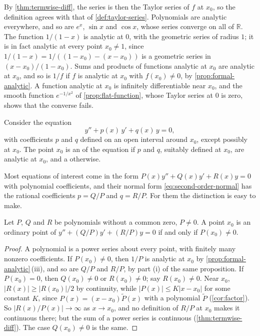 By \cref{thm:termwise-diff}, the series is then the Taylor series of $f$ at $x_0$, so the definition agrees with that of \cref{def:taylor-series}. Polynomials are analytic everywhere, and so are $e^x$, $\sin x$ and $\cos x$, whose series converge on all of $\mathbb R$. The function $1/(1-x)$ is analytic at $0$, with the geometric series of radius $1$; it is in fact analytic at every point $x_0\ne1$, since $1/(1-x)=1/((1-x_0)-(x-x_0))$ is a geometric series in $(x-x_0)/(1-x_0)$. Sums and products of functions analytic at $x_0$ are analytic at $x_0$, and so is $1/f$ if $f$ is analytic at $x_0$ with $f(x_0)\ne0$, by \cref{prop:formal-analytic}. A function analytic at $x_0$ is infinitely differentiable near $x_0$, and the smooth function $e^{-1/x^2}$ of \cref{prop:flat-function}, whose Taylor series at $0$ is zero, shows that the converse fails.

\begin{definition}
\label{def:ordinary-point}
Consider the equation
\begin{equation}
y''+p(x)\,y'+q(x)\,y=0 ,
\label{eq:second-order-normal}
\end{equation}
with coefficients $p$ and $q$ defined on an open interval around $x_0$, except possibly at $x_0$. The point $x_0$ is an  of the equation if $p$ and $q$, suitably defined at $x_0$, are analytic at $x_0$, and a  otherwise.
\end{definition}

Most equations of interest come in the form $P(x)y''+Q(x)y'+R(x)y=0$ with polynomial coefficients, and their normal form \eqref{eq:second-order-normal} has the rational coefficients $p=Q/P$ and $q=R/P$. For them the distinction is easy to make.

\begin{proposition}
\label{prop:polynomial-ordinary}
Let $P$, $Q$ and $R$ be polynomials without a common zero, $P\ne0$. A point $x_0$ is an ordinary point of $y''+(Q/P)y'+(R/P)y=0$ if and only if $P(x_0)\ne0$.
\end{proposition}

\begin{proof}
A polynomial is a power series about every point, with finitely many nonzero coefficients. If $P(x_0)\ne0$, then $1/P$ is analytic at $x_0$ by \cref{prop:formal-analytic}\,(iii), and so are $Q/P$ and $R/P$, by part (i) of the same proposition. If $P(x_0)=0$, then $Q(x_0)\ne0$ or $R(x_0)\ne0$; say $R(x_0)\ne0$. Near $x_0$, $|R(x)|\ge|R(x_0)|/2$ by continuity, while $|P(x)|\le K|x-x_0|$ for some constant $K$, since $P(x)=(x-x_0)\tilde P(x)$ with a polynomial $\tilde P$ (\cref{cor:factor}). So $|R(x)/P(x)|\to\infty$ as $x\to x_0$, and no definition of $R/P$ at $x_0$ makes it continuous there; but the sum of a power series is continuous (\cref{thm:termwise-diff}). The case $Q(x_0)\ne0$ is the same.
\end{proof}


